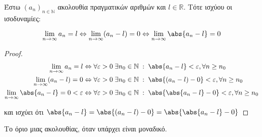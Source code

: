 \documentclass[main.tex]{subfiles}
\begin{document}
\begin{prop}
    Έστω $ (a_{n})_{n \in \mathbb{N}} $ ακολουθία πραγματικών αριθμών και 
    $ l \in \mathbb{R} $. Τότε ισχύου οι ισοδυναμίες:

    \[ \lim_{n \to \infty} a_{n} = l \Leftrightarrow \lim_{n \to \infty} (
        a_{n}- l) = 0 
    \Leftrightarrow \lim_{n \to \infty} \abs{a_{n}-l} = 0\]
\end{prop}

\begin{proof}
\item {}
    \begin{align*} 
        \lim_{n \to \infty} a_{n}= l & \Leftrightarrow \forall 
        \varepsilon > 0 \; \exists n_{0} \in \mathbb{N} \; : \; 
        \abs{a_{n}-l} < \varepsilon, \forall n \geq n_{0} \\ 
        \lim_{n \to \infty} (a_{n}-l) = 0 & \Leftrightarrow \forall 
        \varepsilon >0 \; \exists n_{0} \in \mathbb{N} \; : \; 
        \abs {(a_{n}-l) - 0} < \varepsilon , \forall n \geq n_{0} \\
        \lim_{n \to \infty} \abs{a_{n}-l}=0 < \varepsilon & \Leftrightarrow 
        \forall \varepsilon > 0 \; \exists n_{0} \in \mathbb{N} 
        \; : \; \abs {\abs{a_{n}- l } - 0} < \varepsilon, \forall n \geq 
        n_{0} 
    \end{align*}

    και ισχύει ότι $ \abs{a_{n}-l} = \abs{(a_{n}-l)-0} = 
    \abs{\abs{a_{n}- l} -0} $
\end{proof}

\begin{thm}
    Το όριο μιας ακολουθίας, όταν υπάρχει είναι μοναδικό.
\end{thm}
\end{document}
